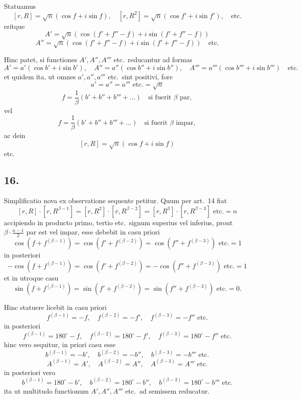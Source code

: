 \documentclass[12pt,a4paper]{article}
\begin{document}
Statuamus
\[
[r,R] = \sqrt{n}(\cos f + i\sin f), \quad [r,R^2] = \sqrt{n}(\cos f' + i\sin f'), \quad\text{etc.}
\]
eritque
\[
A' = \sqrt{n}(\cos(f'+f''-f) + i\sin(f'+f''-f))
\]
\[
A'' = \sqrt{n}(\cos(f'+f''-f) + i\sin(f'+f''-f)) \quad\text{etc.}
\]

Hinc patet, si functiones $A', A'', A'''$ etc.\ reducantur ad formas
\[
A' = a'(\cos b' + i\sin b'), \quad A'' = a''(\cos b'' + i\sin b''), \quad A''' = a'''(\cos b''' + i\sin b''') \quad\text{etc.}
\]
et quidem ita, ut omnes $a', a'', a'''$ etc.\ sint positivi, fore
\[
a' = a'' = a''' \text{ etc.} = \sqrt{n}
\]
\[
f = \frac{1}{\beta}(b' + b'' + b''' + \ldots) \quad\text{si fuerit } \beta\text{ par},
\]
vel
\[
f = \frac{1}{\beta}(b' + b'' + b''' + \ldots) \quad\text{si fuerit } \beta\text{ impar},
\]
ac dein
\[
[r,R] = \sqrt{n}(\cos f + i\sin f)
\]
etc.

\subsection*{16.}

Simplificatio nova ex observatione sequente petitur. Quum per art.\ 14 fiat
\[
[r,R] \cdot [r, R^{\beta-1}] = [r,R^2] \cdot [r, R^{\beta-2}] = [r,R^3] \cdot [r, R^{\beta-3}] \text{ etc.} = n
\]
accipiendo in producto primo, tertio etc.\ signum superius vel inferius, prout $\beta\cdot\frac{n-1}{2}$ par est vel impar, esse debebit in casu priori
\[
\cos(f + f^{(\beta-1)}) = \cos(f' + f^{(\beta-2)}) = \cos(f'' + f^{(\beta-3)}) \text{ etc.} = 1
\]
in posteriori
\[
-\cos(f + f^{(\beta-1)}) = \cos(f' + f^{(\beta-2)}) = -\cos(f'' + f^{(\beta-3)}) \text{ etc.} = 1
\]
et in utroque casu
\[
\sin(f + f^{(\beta-1)}) = \sin(f' + f^{(\beta-2)}) = \sin(f'' + f^{(\beta-3)}) \text{ etc.} = 0.
\]

Hinc statuere licebit in casu priori
\[
f^{(\beta-1)} = -f, \quad f^{(\beta-2)} = -f', \quad f^{(\beta-3)} = -f'' \text{ etc.}
\]
in posteriori
\[
f^{(\beta-1)} = 180^\circ - f, \quad f^{(\beta-2)} = 180^\circ - f', \quad f^{(\beta-3)} = 180^\circ - f'' \text{ etc.}
\]
hinc vero sequitur, in priori casu esse
\[
b^{(\beta-1)} = -b', \quad b^{(\beta-2)} = -b'', \quad b^{(\beta-3)} = -b''' \text{ etc.}
\]
\[
A^{(\beta-1)} = A', \quad A^{(\beta-2)} = A'', \quad A^{(\beta-3)} = A''' \text{ etc.}
\]
in posteriori vero
\[
b^{(\beta-1)} = 180^\circ - b', \quad b^{(\beta-2)} = 180^\circ - b'', \quad b^{(\beta-3)} = 180^\circ - b''' \text{ etc.}
\]
ita ut multitudo functionum $A', A'', A'''$ etc.\ ad semissem reducatur.
\end{document}
